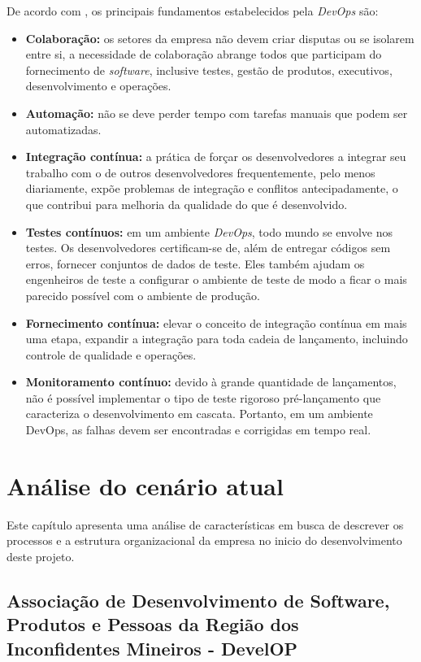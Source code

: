 \documentclass[
12pt,				%
openright,			%
oneside,			%
a4paper,			%
english,			%
french,				%
spanish,			%
brazil,				%
]{abntex2}
\begin{document}
De acordo com , os principais fundamentos estabelecidos pela \textit{DevOps} são:

\begin{itemize}
	\item \textbf{Colaboração:} os setores da empresa não devem criar disputas ou se isolarem entre si, a necessidade de colaboração abrange todos que participam do fornecimento de \textit{software}, inclusive testes, gestão de produtos, executivos, desenvolvimento e operações.
	\item \textbf{Automação:} não se deve perder tempo com tarefas manuais que podem ser automatizadas.
	\item \textbf{Integração contínua:} a prática de forçar os desenvolvedores a integrar seu trabalho com o de outros desenvolvedores frequentemente, pelo menos diariamente, expõe problemas de integração e conflitos antecipadamente, o que contribui para melhoria da qualidade do que é desenvolvido.
	\item \textbf{Testes contínuos:} em um ambiente \textit{DevOps}, todo mundo se envolve nos testes. Os desenvolvedores certificam-se de, além de entregar códigos sem erros, fornecer conjuntos de dados de teste. Eles também ajudam os engenheiros de teste a configurar o ambiente de teste de modo a ficar o mais parecido possível com o ambiente de produção.
	\item \textbf{Fornecimento contínua:} elevar o conceito de integração contínua em mais uma etapa, expandir a integração para toda cadeia de lançamento, incluindo controle de qualidade e operações.
	\item \textbf{Monitoramento contínuo:} devido à grande quantidade de lançamentos, não é possível implementar o tipo de teste rigoroso pré-lançamento que caracteriza o desenvolvimento em cascata. Portanto, em um ambiente DevOps, as falhas devem ser encontradas e corrigidas em tempo real.
\end{itemize}



\chapter{Análise do cenário atual}

Este capítulo apresenta uma análise de características em busca de descrever os processos e a estrutura organizacional da empresa no inicio do desenvolvimento deste projeto.

\section{Associação de Desenvolvimento de Software, Produtos e Pessoas da Região dos Inconfidentes Mineiros - DevelOP}
\end{document}

